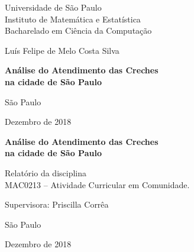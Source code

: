 \documentclass[12pt, a4paper]{book}
\begin{document}
	
	\thispagestyle{empty}
	\begin{center}
		\vspace*{2.3cm}
		Universidade de São Paulo\\
		Instituto de Matemática e Estatística\\
		Bacharelado em Ciência da Computação
		
		
		\vspace*{3cm}
		\Large{Luís Felipe de Melo Costa Silva}
		
		
		\vspace{3cm}
		\textbf{\Large{Análise do Atendimento das Creches
			    \\ na cidade de São Paulo}}
		
		
		\vskip 5cm
		\normalsize{São Paulo}
		
		\normalsize{Dezembro de 2018}
	\end{center}

	\newpage
	\thispagestyle{empty}
	\begin{center}
		\vspace*{2.3 cm}
		\textbf{\Large{Análise do Atendimento das Creches
				\\ na cidade de São Paulo}}
		\vspace*{2 cm}
	\end{center}
	
	\vskip 2cm
	
	\begin{flushright}
		Relatório da disciplina \\
		MAC0213 -- Atividade Curricular em Comunidade.
	\end{flushright}
	
	\vskip 5cm
	
	\begin{center}
		Supervisora: Priscilla Corrêa
		
		\vskip 5cm
		\normalsize{São Paulo}
		
		\normalsize{Dezembro de 2018}
	\end{center}
	\pagebreak
	
	\tableofcontents  

	\mainmatter
	
\end{document}
